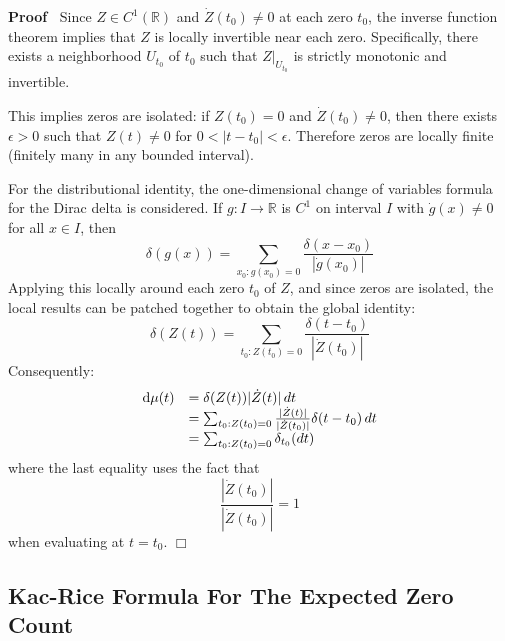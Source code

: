 \documentclass{article}
\newcommand{\mathd}{\mathrm{d}}
\newenvironment{proof}{\noindent\textbf{Proof\ }}{\hspace*{\fill}$\Box$\medskip}
\begin{document}
\begin{proof}
  Since $Z \in C^1 (\mathbb{R})$ and $\dot{Z} (t_0) \neq 0$ at each zero
  $t_0$, the inverse function theorem implies that $Z$ is locally invertible
  near each zero. Specifically, there exists a neighborhood $U_{t_0}$ of $t_0$
  such that $Z|_{U_{t_0}}$ is strictly monotonic and invertible.
  
  This implies zeros are isolated: if $Z (t_0) = 0$ and $\dot{Z} (t_0) \neq
  0$, then there exists $\epsilon > 0$ such that $Z (t) \neq 0$ for $0 < |t -
  t_0 | < \epsilon$. Therefore zeros are locally finite (finitely many in any
  bounded interval).
  
  For the distributional identity, the one-dimensional change of variables
  formula for the Dirac delta is considered. If $g : I \to \mathbb{R}$ is
  $C^1$ on interval $I$ with $\dot{g} (x) \neq 0$ for all $x \in I$, then
  \begin{equation}
    \delta (g (x)) = \sum_{x_0 : g (x_0) = 0} \frac{\delta (x - x_0)}{|
    \dot{g} (x_0) |}
  \end{equation}
  Applying this locally around each zero $t_0$ of $Z$, and since zeros are
  isolated, the local results can be patched together to obtain the global
  identity:
  \begin{equation}
    \delta (Z (t)) = \sum_{t_0 : Z (t_0) = 0} \frac{\delta (t - t_0)}{|
    \dot{Z} (t_0) |}
  \end{equation}
  Consequently:
  \begin{equation}
    \begin{array}{ll}
      \mathd \mu (t) & = \delta (Z (t)) | \dot{Z} (t) |  \hspace{0.17em} dt\\
      & = \sum_{t_0 : Z (t_0) = 0} \frac{| \dot{Z} (t) |}{| \dot{Z} (t_0) |}
      \delta (t - t_0)  \hspace{0.17em} dt\\
      & = \sum_{t_0 : Z (t_0) = 0} \delta_{t_0}  (dt)
    \end{array}
  \end{equation}
  where the last equality uses the fact that
  \begin{equation}
    \frac{| \dot{Z} (t_0) |}{| \dot{Z} (t_0) |} = 1
  \end{equation}
  when evaluating at $t = t_0$.
\end{proof}

\subsection{Kac-Rice Formula For The Expected Zero Count}
\end{document}
